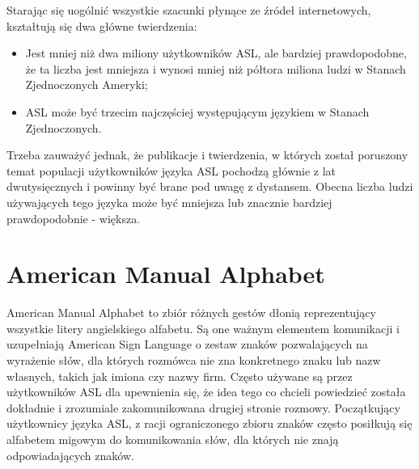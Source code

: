 \documentclass[a4paper,12pt,oneside]{book} %
\begin{document}
Starając się uogólnić wszystkie szacunki płynące ze źródeł internetowych, kształtują się dwa główne twierdzenia:
\begin{itemize}
	\item Jest mniej niż dwa miliony użytkowników ASL, ale bardziej prawdopodobne, że ta liczba jest mniejsza i wynosi mniej niż półtora miliona ludzi w Stanach Zjednoczonych Ameryki;
	\item ASL może być trzecim najczęściej występującym językiem w Stanach Zjednoczonych\cite{population}.
\end{itemize}
Trzeba zauważyć jednak, że publikacje i twierdzenia, w których został poruszony temat populacji użytkowników języka ASL pochodzą głównie z lat dwutysięcznych i powinny być brane pod uwagę z dystansem. Obecna liczba ludzi używających tego języka może być mniejsza lub znacznie bardziej prawdopodobnie - większa.

\section{American Manual Alphabet}
American Manual Alphabet to zbiór różnych gestów dłonią reprezentujący wszystkie litery angielskiego alfabetu. Są one ważnym elementem komunikacji i uzupełniają American Sign Language o zestaw znaków pozwalających na wyrażenie słów, dla których rozmówca nie zna konkretnego znaku lub nazw własnych, takich jak imiona czy nazwy firm. Często używane są przez użytkowników ASL dla upewnienia się, że idea tego co chcieli powiedzieć została dokładnie i zrozumiale zakomunikowana drugiej stronie rozmowy. Początkujący użytkownicy języka ASL, z racji ograniczonego zbioru znaków często posiłkują się alfabetem migowym do komunikowania słów, dla których nie znają odpowiadających znaków\cite{costello}.
\end{document}
